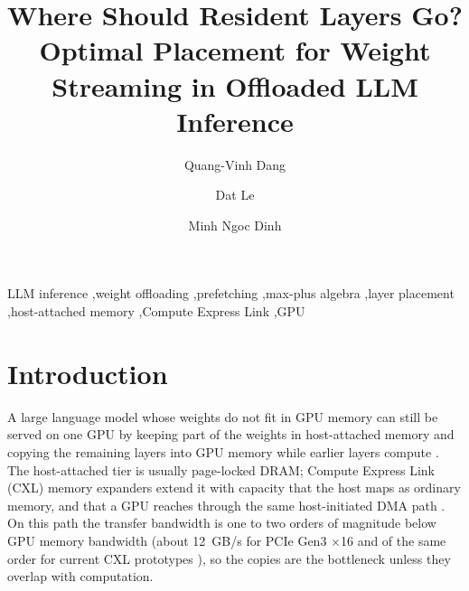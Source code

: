 \documentclass[final,5p,times,twocolumn]{elsarticle}
\theoremstyle{definition}
\begin{document}
\begin{frontmatter}

\title{Where Should Resident Layers Go? Optimal Placement for Weight Streaming in Offloaded LLM Inference}

\author[buv]{Quang-Vinh Dang}
\author[uef]{Dat Le}
\author[mil]{Minh Ngoc Dinh}
\address[buv]{British University Vietnam, Hung Yen, Vietnam}
\address[uef]{Department of Science, Technology, and International Projects, Ho Chi Minh City University of Economics and Finance, Ho Chi Minh City 700000, Vietnam}
\address[mil]{Millennia Education, Ho Chi Minh City, Vietnam}

\begin{abstract}

\end{abstract}

\begin{keyword}
LLM inference \sep weight offloading \sep prefetching \sep max-plus algebra \sep layer placement \sep host-attached memory \sep Compute Express Link \sep GPU
\end{keyword}

\end{frontmatter}

\section{Introduction}
\label{sec:intro}

A large language model whose weights do not fit in GPU memory can still be served on one GPU by keeping part of the weights in host-attached memory and copying the remaining layers into GPU memory while earlier layers compute \cite{sheng2023flexgen,rajbhandari2021infinity,hf2024accelerate}. The host-attached tier is usually page-locked DRAM; Compute Express Link (CXL) memory expanders extend it with capacity that the host maps as ordinary memory, and that a GPU reaches through the same host-initiated DMA path \cite{yoon2025tract,jang2026itme}. On this path the transfer bandwidth is one to two orders of magnitude below GPU memory bandwidth (about 12~GB/s for PCIe Gen3 $\times$16 and of the same order for current CXL prototypes \cite{yoon2025tract,jang2026itme,demystifying2023}), so the copies are the bottleneck unless they overlap with computation.
\end{document}
